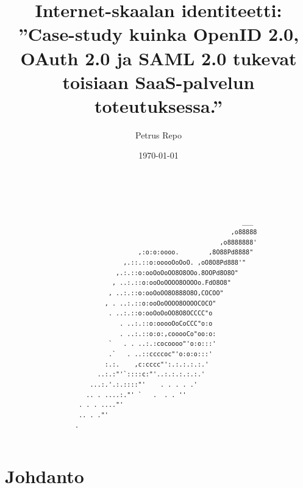 \documentclass[finnish,gradu]{tktltiki}
\begin{document}
\title{Internet-skaalan identiteetti:
    \\ ''Case-study kuinka OpenID 2.0, OAuth 2.0 ja SAML 2.0 tukevat toisiaan SaaS-palvelun toteutuksessa.''}

\author{Petrus Repo}
\date{\today}
\maketitle


\onehalfspacing

\subject{Tietojenkäsittelytiede}


\begin{abstract}

  \begin{verbatim}




                                                            ___
                                                         ,o88888
                                                      ,o8888888'
                                ,:o:o:oooo.        ,8O88Pd8888"
                            ,.::.::o:ooooOoOoO. ,oO8O8Pd888'"
                          ,.:.::o:ooOoOoOO8O8OOo.8OOPd8O8O"
                         , ..:.::o:ooOoOOOO8OOOOo.FdO8O8"
                        , ..:.::o:ooOoOO8O888O8O,COCOO"
                       , . ..:.::o:ooOoOOOO8OOOOCOCO"
                        . ..:.::o:ooOoOoOO8O8OCCCC"o
                           . ..:.::o:ooooOoCoCCC"o:o
                           . ..:.::o:o:,cooooCo"oo:o:
                        `   . . ..:.:cocoooo"'o:o:::'
                        .`   . ..::ccccoc"'o:o:o:::'
                       :.:.    ,c:cccc"':.:.:.:.:.'
                     ..:.:"'`::::c:"'..:.:.:.:.:.'
                   ...:.'.:.::::"'    . . . . .'
                  .. . ....:."' `   .  . . ''
                . . . ...."'
                .. . ."'
               .

  \end{verbatim}

\end{abstract}

\setcounter{tocdepth}{3}
\mytableofcontents

\section{Johdanto} %
\label{sec:johdanto}
\end{document}
